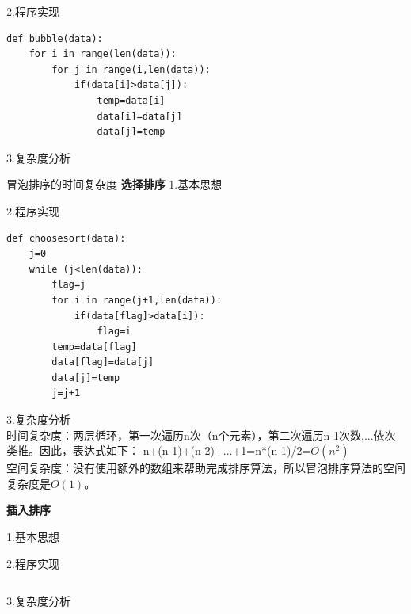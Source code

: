 \documentclass[UTF8]{ctexart}
\begin{document}
2.程序实现
\begin{lstlisting}
def bubble(data):
    for i in range(len(data)):
        for j in range(i,len(data)):
            if(data[i]>data[j]):
                temp=data[i]
                data[i]=data[j]
                data[j]=temp
\end{lstlisting}
3.复杂度分析

冒泡排序的时间复杂度
\textbf{选择排序}
1.基本思想




2.程序实现
\begin{lstlisting}
def choosesort(data):
    j=0
    while (j<len(data)):
        flag=j
        for i in range(j+1,len(data)):
            if(data[flag]>data[i]):
                flag=i
        temp=data[flag]
        data[flag]=data[j]
        data[j]=temp
        j=j+1
\end{lstlisting}
3.复杂度分析\\
时间复杂度：两层循环，第一次遍历n次（n个元素），第二次遍历n-1次数,...依次类推。因此，表达式如下：
n+(n-1)+(n-2)+...+1=n*(n-1)/2=$O(n^2)$\\
空间复杂度：没有使用额外的数组来帮助完成排序算法，所以冒泡排序算法的空间复杂度是$O(1)$。

\textbf{插入排序}

1.基本思想


2.程序实现
\begin{lstlisting}

\end{lstlisting}


3.复杂度分析
\end{document}
